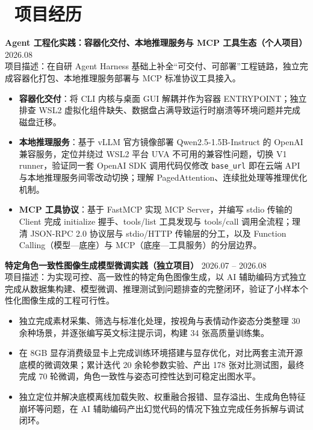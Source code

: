 \documentclass[11pt]{article}
\newlength{\interProjectSpacing}
\newcommand{\projectsep}{\vspace{\interProjectSpacing}}
\newlength{\intraProjectTitleSep}
\newcommand{\titlebreak}{\\[\intraProjectTitleSep]}
\newlength{\intraProjectListTopSep}
\begin{document}
\section{\makebox[\widthof{\faUsers}][c]{\color{CVBlue}\faUsers}\ 项目经历}

\textbf{Agent 工程化实践：容器化交付、本地推理服务与 MCP 工具生态（个人项目）} \hfill 2026.08 \titlebreak
项目描述：在自研 Agent Harness 基础上补全“可交付、可部署”工程链路，独立完成容器化打包、本地推理服务部署与 MCP 标准协议工具接入。
\begin{itemize}[nosep, topsep=\intraProjectListTopSep]
    \item \textbf{容器化交付}：将 CLI 内核与桌面 GUI 解耦并作为容器 ENTRYPOINT；独立排查 WSL2 虚拟化组件缺失、数据盘占满导致运行时崩溃等环境问题并完成磁盘迁移。
    \item \textbf{本地推理服务}：基于 vLLM 官方镜像部署 Qwen2.5-1.5B-Instruct 的 OpenAI 兼容服务，定位并绕过 WSL2 平台 UVA 不可用的兼容性问题，切换 V1 runner，验证同一套 OpenAI SDK 调用代码仅修改 \texttt{base\_url} 即在云端 API 与本地推理服务间零改动切换；理解 PagedAttention、连续批处理等推理优化机制。
    \item \textbf{MCP 工具协议}：基于 FastMCP 实现 MCP Server，并编写 stdio 传输的 Client 完成 initialize 握手、tools/list 工具发现与 tools/call 调用全流程；理清 JSON-RPC 2.0 协议层与 stdio/HTTP 传输层的分工，以及 Function Calling（模型—底座）与 MCP（底座—工具服务）的分层边界。
\end{itemize}

\projectsep

\textbf{特定角色一致性图像生成模型微调实践（独立项目）} \hfill 2026.07 -- 2026.08 \titlebreak
项目描述：为实现可控、高一致性的特定角色图像生成，以 AI 辅助编码方式独立完成从数据集构建、模型微调、推理测试到问题排查的完整闭环，验证了小样本个性化图像生成的工程可行性。
\begin{itemize}[nosep, topsep=\intraProjectListTopSep]
    \item 独立完成素材采集、筛选与标准化处理，按视角与表情动作姿态分类整理 30 余种场景，并逐张编写英文标注提示词，构建 34 张高质量训练集。
    \item 在 8GB 显存消费级显卡上完成训练环境搭建与显存优化，对比两套主流开源底模的微调效果；累计迭代 20 余轮参数实验、产出 178 张对比测试图，最终完成 70 轮微调，角色一致性与姿态可控性达到可稳定出图水平。
    \item 独立定位并解决底模离线加载失败、权重融合报错、显存溢出、生成角色特征崩坏等问题，在 AI 辅助编码产出幻觉代码的情况下独立完成任务拆解与调试闭环。
\end{itemize}
\end{document}
